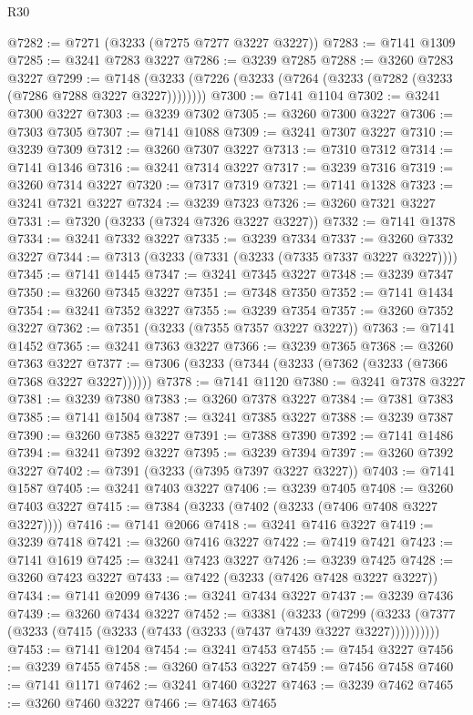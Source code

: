 \begin{lexlean}{R30}
\begin{coremodule}
@7282 := @7271 (@3233 (@7275 @7277 @3227 @3227))
@7283 := @7141 @1309
@7285 := @3241 @7283 @3227
@7286 := @3239 @7285
@7288 := @3260 @7283 @3227
@7299 := @7148 (@3233 (@7226 (@3233 (@7264 (@3233 (@7282 (@3233 (@7286 @7288 @3227 @3227))))))))
@7300 := @7141 @1104
@7302 := @3241 @7300 @3227
@7303 := @3239 @7302
@7305 := @3260 @7300 @3227
@7306 := @7303 @7305
@7307 := @7141 @1088
@7309 := @3241 @7307 @3227
@7310 := @3239 @7309
@7312 := @3260 @7307 @3227
@7313 := @7310 @7312
@7314 := @7141 @1346
@7316 := @3241 @7314 @3227
@7317 := @3239 @7316
@7319 := @3260 @7314 @3227
@7320 := @7317 @7319
@7321 := @7141 @1328
@7323 := @3241 @7321 @3227
@7324 := @3239 @7323
@7326 := @3260 @7321 @3227
@7331 := @7320 (@3233 (@7324 @7326 @3227 @3227))
@7332 := @7141 @1378
@7334 := @3241 @7332 @3227
@7335 := @3239 @7334
@7337 := @3260 @7332 @3227
@7344 := @7313 (@3233 (@7331 (@3233 (@7335 @7337 @3227 @3227))))
@7345 := @7141 @1445
@7347 := @3241 @7345 @3227
@7348 := @3239 @7347
@7350 := @3260 @7345 @3227
@7351 := @7348 @7350
@7352 := @7141 @1434
@7354 := @3241 @7352 @3227
@7355 := @3239 @7354
@7357 := @3260 @7352 @3227
@7362 := @7351 (@3233 (@7355 @7357 @3227 @3227))
@7363 := @7141 @1452
@7365 := @3241 @7363 @3227
@7366 := @3239 @7365
@7368 := @3260 @7363 @3227
@7377 := @7306 (@3233 (@7344 (@3233 (@7362 (@3233 (@7366 @7368 @3227 @3227))))))
@7378 := @7141 @1120
@7380 := @3241 @7378 @3227
@7381 := @3239 @7380
@7383 := @3260 @7378 @3227
@7384 := @7381 @7383
@7385 := @7141 @1504
@7387 := @3241 @7385 @3227
@7388 := @3239 @7387
@7390 := @3260 @7385 @3227
@7391 := @7388 @7390
@7392 := @7141 @1486
@7394 := @3241 @7392 @3227
@7395 := @3239 @7394
@7397 := @3260 @7392 @3227
@7402 := @7391 (@3233 (@7395 @7397 @3227 @3227))
@7403 := @7141 @1587
@7405 := @3241 @7403 @3227
@7406 := @3239 @7405
@7408 := @3260 @7403 @3227
@7415 := @7384 (@3233 (@7402 (@3233 (@7406 @7408 @3227 @3227))))
@7416 := @7141 @2066
@7418 := @3241 @7416 @3227
@7419 := @3239 @7418
@7421 := @3260 @7416 @3227
@7422 := @7419 @7421
@7423 := @7141 @1619
@7425 := @3241 @7423 @3227
@7426 := @3239 @7425
@7428 := @3260 @7423 @3227
@7433 := @7422 (@3233 (@7426 @7428 @3227 @3227))
@7434 := @7141 @2099
@7436 := @3241 @7434 @3227
@7437 := @3239 @7436
@7439 := @3260 @7434 @3227
@7452 := @3381
    (@3233
      (@7299 (@3233 (@7377 (@3233 (@7415 (@3233 (@7433 (@3233 (@7437 @7439 @3227 @3227))))))))))
@7453 := @7141 @1204
@7454 := @3241 @7453
@7455 := @7454 @3227
@7456 := @3239 @7455
@7458 := @3260 @7453 @3227
@7459 := @7456 @7458
@7460 := @7141 @1171
@7462 := @3241 @7460 @3227
@7463 := @3239 @7462
@7465 := @3260 @7460 @3227
@7466 := @7463 @7465

\end{coremodule}
\end{lexlean}
